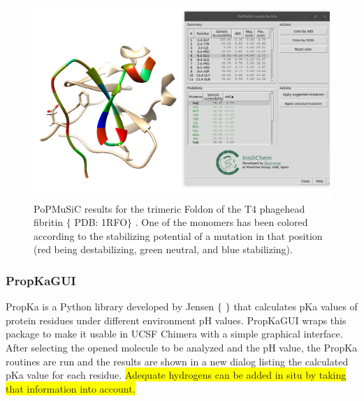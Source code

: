 \begin{figure}[H] %
	\begin{Center}
		\includegraphics[width=\textwidth]{./figures/05/tangram_popmusic.png}
	\end{Center}
	\cprotect\caption[Tangram PoPMuSiC GUI]{PoPMuSiC results for the trimeric Foldon of the T4 phagehead fibritin $ \{ $ PDB: 1RFO$ \} $ . One of the monomers has been colored according to the stabilizing potential of a mutation in that position (red being destabilizing, green neutral, and blue stabilizing).}
	\label{fig:tangram-popmusic}
\end{figure}


\subsubsection{PropKaGUI}
PropKa is a Python library developed by Jensen $ \{ $ $ \} $  that calculates pKa values of protein residues under different environment pH values. PropKaGUI wraps this package to make it usable in UCSF Chimera with a simple graphical interface. After selecting the opened molecule to be analyzed and the pH value, the PropKa routines are run and the results are shown in a new dialog listing the calculated pKa value for each residue. \colorbox{yellow}{Adequate hydrogens can be added in situ by taking that information into account.}

